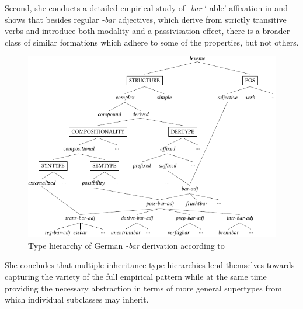 \documentclass[output=paper
 	        ,biblatex
                ,babelshorthands
                ,newtxmath
                ,draftmode
                ,colorlinks, citecolor=brown
]{langscibook}
\begin{document}
Second, she conducts a detailed empirical study of \textit{-bar}
`-able' affixation in  and shows that besides regular
\textit{-bar} adjectives, which derive from strictly transitive verbs and
introduce both modality and a  passivisation effect, there is a 
broader class of similar formations which adhere to some of the
properties, but not others.
\begin{figure}
  \centering
  \includegraphics[scale=1.15]{figures/Riehemann-crop.pdf}
  
  \caption{Type hierarchy of German
    \textit{-bar} derivation according to \citet[]{Riehemann98} }
  \label{fig:Riehemann}
\end{figure}

She concludes that multiple inheritance type hierarchies lend
themselves towards capturing the variety of the full empirical pattern
while at the same time providing the necessary abstraction in terms of
more general supertypes from which individual subclasses may inherit. 



\end{document}
